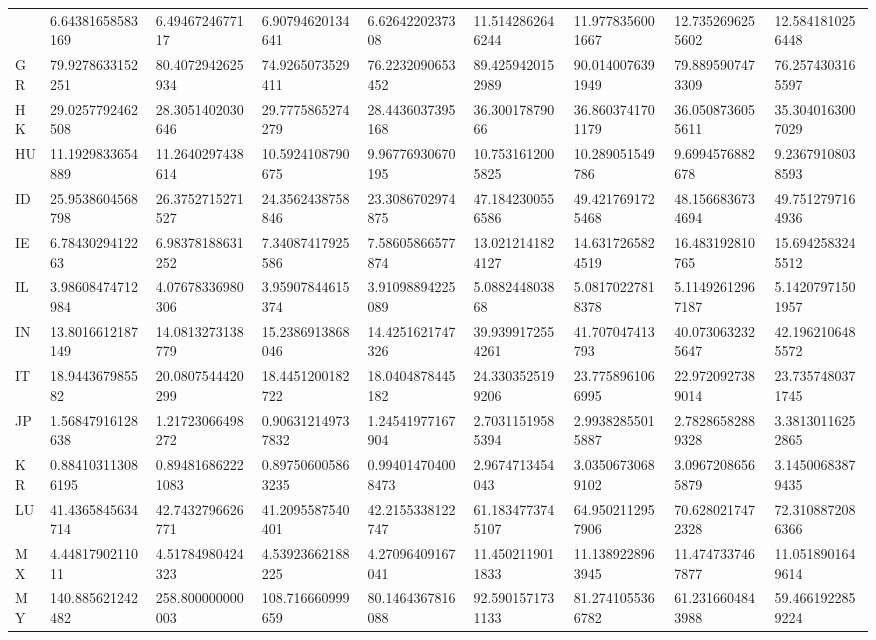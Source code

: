\documentclass[12pt,a4paper]{article}
\begin{document}
\begin{table}
\begin{threeparttable}
\begin{tabular}
{GB} & 6.64381658583169 & 6.4946724677117 & 6.90794620134641 & 6.6264220237308 & 11.5142862646244 & 11.9778356001667 & 12.7352696255602 & 12.5841810256448 \\
{GR} & 79.9278633152251 & 80.4072942625934 & 74.9265073529411 & 76.2232090653452 & 89.4259420152989 & 90.0140076391949 & 79.8895907473309 & 76.2574303165597 \\
{HK} & 29.0257792462508 & 28.3051402030646 & 29.7775865274279 & 28.4436037395168 & 36.30017879066 & 36.8603741701179 & 36.0508736055611 & 35.3040163007029 \\
{HU} & 11.1929833654889 & 11.2640297438614 & 10.5924108790675 & 9.96776930670195 & 10.7531612005825 & 10.289051549786 & 9.6994576882678 & 9.23679108038593 \\
{ID} & 25.9538604568798 & 26.3752715271527 & 24.3562438758846 & 23.3086702974875 & 47.1842300556586 & 49.4217691725468 & 48.1566836734694 & 49.7512797164936 \\
{IE} & 6.7843029412263 & 6.98378188631252 & 7.34087417925586 & 7.58605866577874 & 13.0212141824127 & 14.6317265824519 & 16.483192810765 & 15.6942583245512 \\
{IL} & 3.98608474712984 & 4.07678336980306 & 3.95907844615374 & 3.91098894225089 & 5.088244803868 & 5.08170227818378 & 5.11492612967187 & 5.14207971501957 \\
{IN} & 13.8016612187149 & 14.0813273138779 & 15.2386913868046 & 14.4251621747326 & 39.9399172554261 & 41.707047413793 & 40.0730632325647 & 42.1962106485572 \\
{IT} & 18.944367985582 & 20.0807544420299 & 18.4451200182722 & 18.0404878445182 & 24.3303525199206 & 23.7758961066995 & 22.9720927389014 & 23.7357480371745 \\
{JP} & 1.56847916128638 & 1.21723066498272 & 0.906312149737832 & 1.24541977167904 & 2.70311519585394 & 2.99382855015887 & 2.78286582889328 & 3.38130116252865 \\
{KR} & 0.884103113086195 & 0.894816862221083 & 0.897506005863235 & 0.994014704008473 & 2.9674713454043 & 3.03506730689102 & 3.09672086565879 & 3.14500683879435 \\
{LU} & 41.4365845634714 & 42.7432796626771 & 41.2095587540401 & 42.2155338122747 & 61.1834773745107 & 64.9502112957906 & 70.6280217472328 & 72.3108872086366 \\
{MX} & 4.4481790211011 & 4.51784980424323 & 4.53923662188225 & 4.27096409167041 & 11.4502119011833 & 11.1389228963945 & 11.4747337467877 & 11.0518901649614 \\
{MY} & 140.885621242482 & 258.800000000003 & 108.716660999659 & 80.1464367816088 & 92.5901571731133 & 81.2741055366782 & 61.2316604843988 & 59.4661922859224 \\

\end{tabular}
\end{threeparttable}
\end{table}
\end{document}
